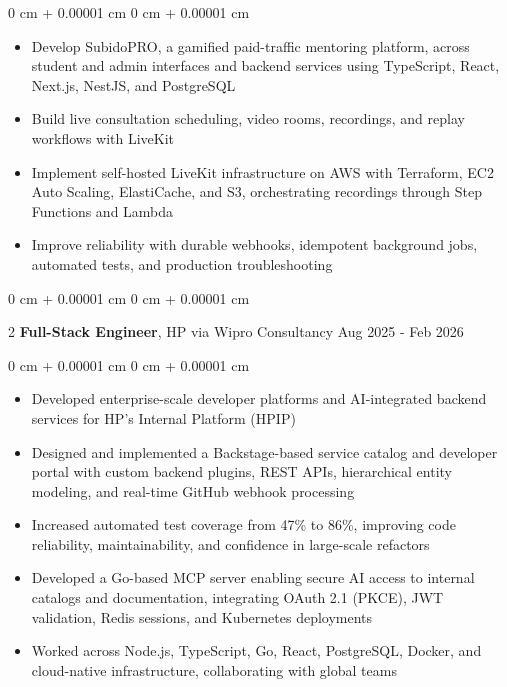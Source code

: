 \documentclass[10pt, letterpaper]{article}
\newenvironment{highlights}{ \begin{itemize}[ topsep=0.10 cm, parsep=0.10 cm, partopsep=0pt,
itemsep=0pt, leftmargin=0 cm + 10pt ] }{ \end{itemize} } %
\newenvironment{onecolentry}{ \begin{adjustwidth}{ 0 cm + 0.00001 cm }{ 0 cm + 0.00001 cm }
}{ \end{adjustwidth} } %
\newenvironment{twocolentry}[2][]{ \onecolentry \def\secondColumn{#2} \setcolumnwidth{\fill, 4.5 cm}
\begin{paracol}{2} }{ \switchcolumn \raggedleft \secondColumn \end{paracol}
\endonecolentry } %
\begin{document}
	\vspace{0.10 cm}
	\begin{onecolentry}
		\begin{highlights}
			\item Develop SubidoPRO, a gamified paid-traffic mentoring platform, across student and admin interfaces and backend services using TypeScript, React, Next.js, NestJS, and PostgreSQL
			\item Build live consultation scheduling, video rooms, recordings, and replay workflows with LiveKit
			\item Implement self-hosted LiveKit infrastructure on AWS with Terraform, EC2 Auto Scaling, ElastiCache, and S3, orchestrating recordings through Step Functions and Lambda
			\item Improve reliability with durable webhooks, idempotent background jobs, automated tests, and production troubleshooting
		\end{highlights}
	\end{onecolentry}

	\vspace{0.2 cm}

	\begin{twocolentry}
		{ Aug 2025 - Feb 2026 } \textbf{Full-Stack Engineer}, HP via Wipro Consultancy
	\end{twocolentry}

	\vspace{0.10 cm}
	\begin{onecolentry}
		\begin{highlights}
			\item Developed enterprise-scale developer platforms and AI-integrated backend services for HP's Internal Platform (HPIP)
			\item Designed and implemented a Backstage-based service catalog and developer portal with custom backend plugins, REST APIs, hierarchical entity modeling, and real-time GitHub webhook processing
			\item Increased automated test coverage from 47\% to 86\%, improving code reliability, maintainability, and confidence in large-scale refactors
			\item Developed a Go-based MCP server enabling secure AI access to internal catalogs and documentation, integrating OAuth 2.1 (PKCE), JWT validation, Redis sessions, and Kubernetes deployments
			\item Worked across Node.js, TypeScript, Go, React, PostgreSQL, Docker, and cloud-native infrastructure, collaborating with global teams
		\end{highlights}
	\end{onecolentry}
\end{document}
